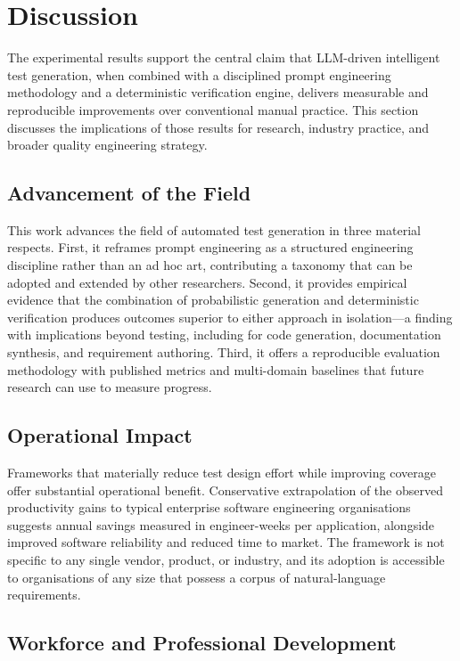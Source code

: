 \documentclass[conference]{IEEEtran}
\begin{document}
\section{Discussion}
\label{sec:discussion}

The experimental results support the central claim that LLM-driven intelligent test generation, when combined with a disciplined prompt engineering methodology and a deterministic verification engine, delivers measurable and reproducible improvements over conventional manual practice. This section discusses the implications of those results for research, industry practice, and broader quality engineering strategy.

\subsection{Advancement of the Field}

This work advances the field of automated test generation in three material respects. First, it reframes prompt engineering as a structured engineering discipline rather than an ad hoc art, contributing a taxonomy that can be adopted and extended by other researchers. Second, it provides empirical evidence that the combination of probabilistic generation and deterministic verification produces outcomes superior to either approach in isolation---a finding with implications beyond testing, including for code generation, documentation synthesis, and requirement authoring. Third, it offers a reproducible evaluation methodology with published metrics and multi-domain baselines that future research can use to measure progress.

\subsection{Operational Impact}

Frameworks that materially reduce test design effort while improving coverage offer substantial operational benefit. Conservative extrapolation of the observed productivity gains to typical enterprise software engineering organisations suggests annual savings measured in engineer-weeks per application, alongside improved software reliability and reduced time to market. The framework is not specific to any single vendor, product, or industry, and its adoption is accessible to organisations of any size that possess a corpus of natural-language requirements.

\subsection{Workforce and Professional Development}
\end{document}
